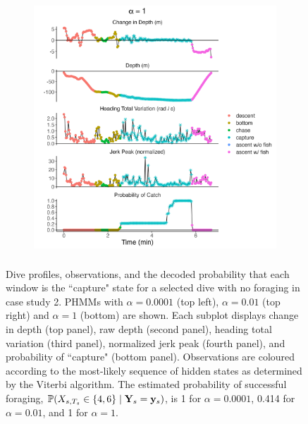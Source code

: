 \begin{figure}
    \begin{subfigure}[t]{0.9\textwidth}
        \centering
        \includegraphics[height = 3.75in]{plt/profile_delt_d_htv_jp_normed_0_4_neg_5489.png}
    \end{subfigure}
    \caption{Dive profiles, observations, and the decoded probability that each window is the ``capture" state for a selected dive with no foraging in case study 2. PHMMs with $\alpha = 0.0001$ (top left), $\alpha = 0.01$ (top right) and $\alpha = 1$ (bottom) are shown. Each subplot displays change in depth (top panel), raw depth (second panel), heading total variation (third panel), normalized jerk peak (fourth panel), and probability of ``capture" (bottom panel). Observations are coloured according to the most-likely sequence of hidden states as determined by the Viterbi algorithm. The estimated probability of successful foraging, $\mathbb{P}(X_{s,T_s} \in \{4,6\} \mid \mathbf{Y}_s = \mathbf{y}_s)$, is 1 for $\alpha = 0.0001$, 0.414 for $\alpha = 0.01$, and 1 for $\alpha = 1$.}
    \label{fig:profiles_5489}
\end{figure}

